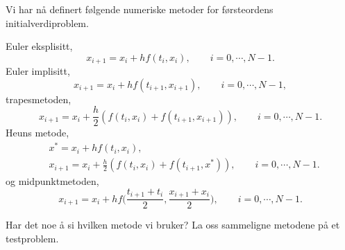 \documentclass{article}
\theoremstyle{plain}
\theoremstyle{definition}
\theoremstyle{remark}
\newenvironment{defn}
{\pushQED{\qed}\renewcommand{\qedsymbol}{$\triangle$}\defnx}
{\popQED\enddefnx}
\newcommand{\biggparanth}[1]{\bigg(#1\bigg)}
\begin{document}
\begin{defn}
    Vi har nå definert følgende numeriske metoder for førsteordens initialverdiproblem.

    Euler eksplisitt,
    \begin{equation*}
        x_{i + 1} = x_i + h f(t_i, x_i), \qquad i = 0, \cdots, N - 1.
    \end{equation*}
    Euler implisitt,
    \begin{equation*}
        x_{i + 1} = x_i + h f(t_{i+1}, x_{i+1}), \qquad i = 0, \cdots, N - 1,
    \end{equation*}
    trapesmetoden,
    \begin{equation*}
        x_{i + 1} = x_i + \frac{h}{2} (f(t_{i}, x_{i}) + f(t_{i+1}, x_{i+1})), \qquad i = 0, \cdots, N - 1.
    \end{equation*}
    Heuns metode,
    \begin{equation*}
        \begin{aligned}
            & x^* = x_i + h f(t_i, x_i), \\
            & x_{i + 1} = x_i + \frac{h}{2} (f(t_{i}, x_{i}) + f(t_{i+1}, x^*)), \qquad i = 0, \cdots, N - 1.
        \end{aligned}
    \end{equation*}
    og midpunktmetoden,
    \begin{equation*}
        x_{i + 1} = x_i + h f\biggparanth{\frac{t_{i+1} + t_i}{2}, \frac{x_{i+1} + x_i}{2}}, \qquad i = 0, \cdots, N - 1.
    \end{equation*}
\end{defn}

Har det noe å si hvilken metode vi bruker? La oss sammeligne metodene på et testproblem.
\end{document}

